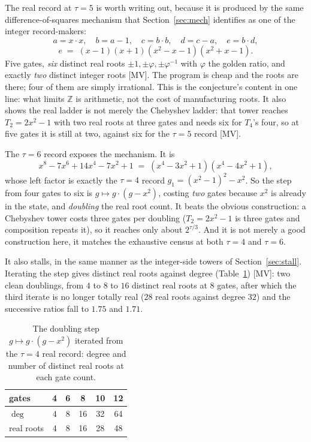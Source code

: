 \documentclass[11pt]{article}
\theoremstyle{definition}
\theoremstyle{remark}
\begin{document}
The real record at $\tau = 5$ is worth writing out, because it is produced by
the same difference-of-squares mechanism that Section~\ref{sec:mech} identifies
as one of the integer record-makers:
\[
  a = x\cdot x,\quad b = a - 1,\quad c = b \cdot b,\quad d = c - a,\quad
  e = b \cdot d,
\]
\[
  e \;=\; (x-1)(x+1)(x^2-x-1)(x^2+x-1).
\]
Five gates, \emph{six} distinct real roots $\pm 1, \pm\varphi, \pm\varphi^{-1}$
with $\varphi$ the golden ratio, and exactly \emph{two} distinct integer roots
[MV]. The program is cheap and the roots are there; four of them are simply
irrational. This is the conjecture's content in one line: what limits
$\mathbb{Z}$ is arithmetic, not the cost of manufacturing roots. It also shows
the real ladder is not merely the Chebyshev ladder: that tower reaches
$T_2 = 2x^2-1$ with two real roots at three gates and needs six for $T_4$'s
four, so at five gates it is still at two, against six for the $\tau = 5$ record [MV].

The $\tau = 6$ record exposes the mechanism. It is
\[
  x^8 - 7x^6 + 14x^4 - 7x^2 + 1 \;=\; (x^4-3x^2+1)(x^4-4x^2+1),
\]
whose left factor is exactly the $\tau = 4$ record $g_1 = (x^2-1)^2 - x^2$. So
the step from four gates to six is $g \mapsto g\cdot(g-x^2)$, costing
\emph{two} gates because $x^2$ is already in the state, and \emph{doubling} the
real root count. It beats the obvious construction: a Chebyshev tower costs
three gates per doubling ($T_2 = 2x^2-1$ is three gates and composition repeats
it), so it reaches only about $2^{\tau/3}$. And it is not merely a good
construction here, it matches the exhaustive census at both $\tau = 4$ and
$\tau = 6$.

It also stalls, in the same manner as the integer-side towers of
Section~\ref{sec:stall}. Iterating the step gives distinct real roots against
degree (Table~\ref{tab:doubling}) [MV]: two clean doublings, from $4$ to $8$ to $16$ distinct real roots at $8$ gates,
after which the third iterate is no longer totally real ($28$ real roots against degree $32$) and the successive ratios fall
to $1.75$ and $1.71$.

\begin{table}[t]
\centering
\caption{The doubling step $g \mapsto g\cdot(g - x^2)$ iterated from the $\tau = 4$ real
record: degree and number of distinct real roots at each gate count.}
\label{tab:doubling}
\begin{tabular}{l|ccccc}
\toprule
gates & 4 & 6 & 8 & 10 & 12\\\midrule
$\deg$ & 4 & 8 & 16 & 32 & 64\\
real roots & 4 & 8 & 16 & 28 & 48\\
\bottomrule
\end{tabular}
\end{table}
\end{document}
